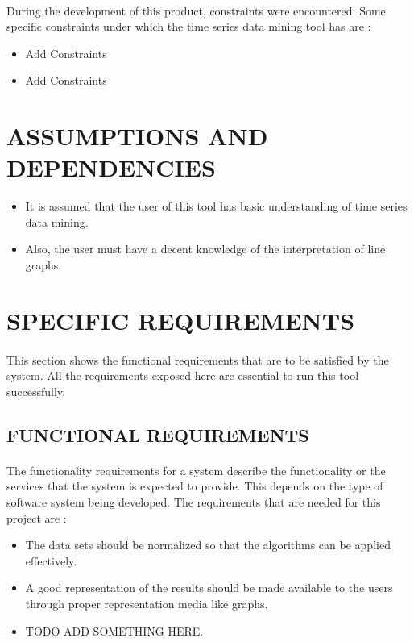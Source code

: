 \documentclass[12pt]{report}
\begin{document}
\paragraph{}During the development of this product, constraints were encountered. Some specific constraints under which the time series data mining tool has are :

\begin{itemize} 
\item{}Add Constraints
\item{} Add Constraints
\end{itemize}

\section{ASSUMPTIONS AND DEPENDENCIES}
 \begin{itemize}
\item{}It is assumed that the user of this tool has basic understanding of time series data mining.
 
\item{}Also, the user must have a decent knowledge of the interpretation of line graphs.
\end{itemize}

\section{SPECIFIC REQUIREMENTS}
\paragraph{}This section shows the functional requirements that are to be satisfied by the system. All the requirements exposed here are essential to run this tool successfully.

\subsection{FUNCTIONAL REQUIREMENTS}
\paragraph{}The functionality requirements for a system describe the functionality or the services that the system is expected to provide. This depends on the type of software system being developed. 
The requirements that are needed for this project are :
 \begin{itemize}
\item The data sets should be normalized so that the algorithms can be applied effectively.
\item A good representation of the results should be made available to the users through proper representation media like graphs.
\end{itemize}
 \begin{itemize}
\item TODO ADD SOMETHING HERE.
\end{itemize}
\end{document}
